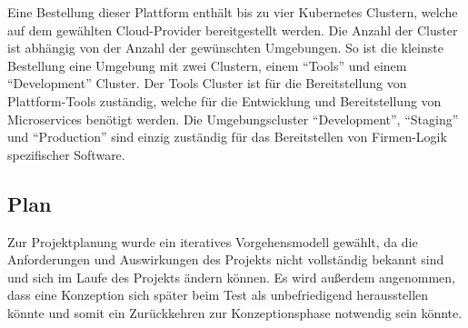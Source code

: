 Eine Bestellung dieser Plattform enthält bis zu vier Kubernetes Clustern, welche auf dem gewählten Cloud-Provider bereitgestellt werden.
Die Anzahl der Cluster ist abhängig von der Anzahl der gewünschten Umgebungen.
So ist die kleinste Bestellung eine Umgebung mit zwei Clustern, einem \enquote{Tools} und einem \enquote{Development} Cluster.
Der Tools Cluster ist für die Bereitstellung von Plattform-Tools zuständig, welche für die Entwicklung und Bereitstellung von Microservices benötigt werden.
Die Umgebungscluster \enquote{Development}, \enquote{Staging} und \enquote{Production} sind einzig zuständig für das Bereitstellen von Firmen-Logik spezifischer Software.

\subsection{Plan}
\label{subsec:description:plan}

Zur Projektplanung wurde ein iteratives Vorgehensmodell gewählt, da die Anforderungen und Auswirkungen des Projekts nicht vollständig bekannt sind und sich im Laufe des Projekts ändern können.
Es wird außerdem angenommen, dass eine Konzeption sich später beim Test als unbefriedigend herausstellen könnte und somit ein Zurückkehren zur Konzeptionsphase notwendig sein könnte.

